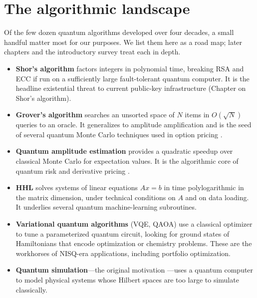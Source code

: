 \section{The algorithmic landscape}

Of the few dozen quantum algorithms developed over four decades, a small handful matter most for our purposes. We list them here as a road map; later chapters and the introductory survey treat each in depth.

\begin{itemize}
\item \textbf{Shor's algorithm} \citep{shor_polynomial_1997} factors integers in polynomial time, breaking RSA and ECC if run on a sufficiently large fault-tolerant quantum computer. It is the headline existential threat to current public-key infrastructure (Chapter on Shor's algorithm).
\item \textbf{Grover's algorithm} \citep{grover_fast_1996} searches an unsorted space of $N$ items in $O(\sqrt N)$ queries to an oracle. It generalizes to amplitude amplification and is the seed of several quantum Monte Carlo techniques used in option pricing \citep{stamatopoulos_option_2020}.
\item \textbf{Quantum amplitude estimation} provides a quadratic speedup over classical Monte Carlo for expectation values. It is the algorithmic core of quantum risk and derivative pricing \citep{egger_quantum_2020,matsakos_quantum_2024}.
\item \textbf{HHL} \citep{harrow_quantum_2009} solves systems of linear equations $Ax=b$ in time polylogarithmic in the matrix dimension, under technical conditions on $A$ and on data loading. It underlies several quantum machine-learning subroutines.
\item \textbf{Variational quantum algorithms} (VQE, QAOA) \citep{cerezo_variational_2021,farhi_quantum_2014,peruzzo_variational_2014} use a classical optimizer to tune a parameterized quantum circuit, looking for ground states of Hamiltonians that encode optimization or chemistry problems. These are the workhorses of NISQ-era applications, including portfolio optimization.
\item \textbf{Quantum simulation}---the original motivation \citep{feynman_simulating_1982}---uses a quantum computer to model physical systems whose Hilbert spaces are too large to simulate classically.
\end{itemize}

